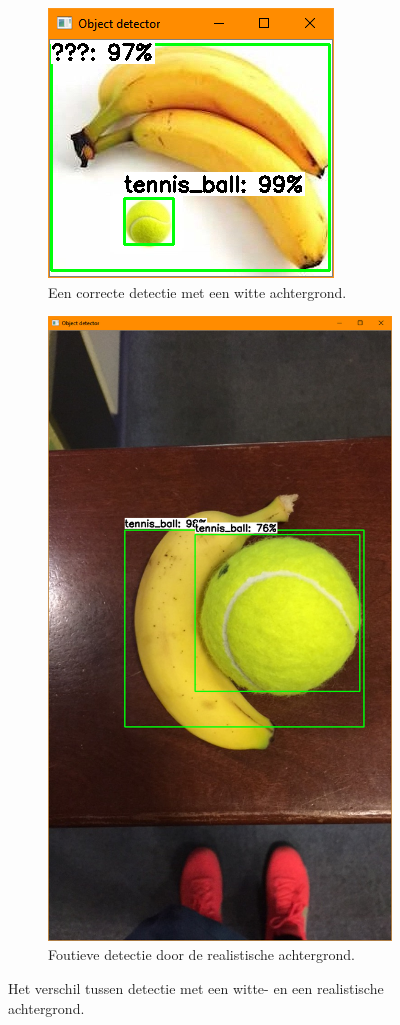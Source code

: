 \begin{figure}[H]
    \begin{subfigure}{0.5\textwidth}
        \includegraphics[width=0.9\linewidth]{img/ball_banana_white.png} 
        \caption{Een correcte detectie met een witte achtergrond.}
        \label{fig:ball-banana-white}
    \end{subfigure}
        \begin{subfigure}{0.5\textwidth}
        \includegraphics[width=0.5\linewidth]{img/ball_banana_background.png}
        \caption{Foutieve detectie door de realistische achtergrond.}
        \label{fig:ball-banana-background}
    \end{subfigure}
    \caption{Het verschil tussen detectie met een witte- en een realistische achtergrond.}
    \label{fig:detection-positive-negative}
\end{figure}
